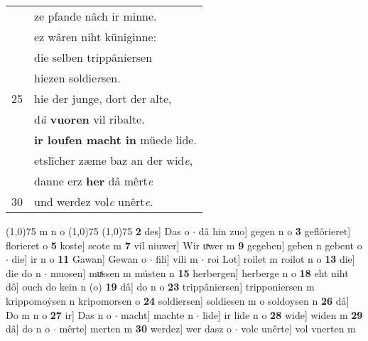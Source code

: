 \documentclass[8pt,a4paper,notitlepage]{article}
\begin{document}
\begin{table}[ht]
\begin{minipage}[t]{0.5\linewidth}
\begin{tabular}{rl}
 & ze pfande nâch ir minne.\\ 
 & ez wâren niht küniginne:\\ 
 & die selben trippâniersen\\ 
 & hiezen soldie\textit{r}sen.\\ 
25 & hie der junge, dort der alte,\\ 
 & d\textit{â} \textbf{vuoren} vil ribalte.\\ 
 & \textbf{ir loufen macht in} müede lide.\\ 
 & etslîcher zæme baz an der wid\textit{e},\\ 
 & danne erz \textbf{her} dâ mêrt\textit{e}\\ 
30 & und werdez vol\textit{c} unêrt\textit{e}.\\ 
\end{tabular}
\scriptsize
\line(1,0){75} \newline
m n o \newline
\line(1,0){75} \newline
\newline
\line(1,0){75} \newline
\textbf{2} des] Das o  $\cdot$ dâ hin zuo] gegen n o \textbf{3} geflôrieret] florieret o \textbf{5} koste] scote m \textbf{7} vil niuwer] Wir uͯwer m \textbf{9} gegeben] geben n gebent o  $\cdot$ die] ir n o \textbf{11} Gawan] Gewan o  $\cdot$ fili] vili m  $\cdot$ roi Lot] roilet m roilot n o \textbf{13} die] die do n  $\cdot$ muosen] muͯssen m músten n \textbf{15} herbergen] herberge n o \textbf{18} eht niht dô] ouch do kein n (o) \textbf{19} dâ] do n o \textbf{23} trippâniersen] tripponiersen m krippomoẏsen n kripomorsen o \textbf{24} soldiersen] soldiesen m o soldoysen n \textbf{26} dâ] Do m n o \textbf{27} ir] Das n o  $\cdot$ macht] machte n  $\cdot$ lide] ir lide n o \textbf{28} wide] widen m \textbf{29} dâ] do n o  $\cdot$ mêrte] merten m \textbf{30} werdez] wer dasz o  $\cdot$ volc unêrte] vol vnerten m \newline
\end{minipage}
\end{table}
\newpage
\end{document}
